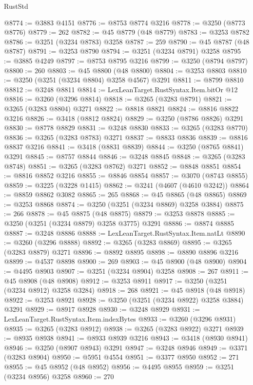\begin{lexlean}{RustStd}
\begin{coremodule}
@8774 := @3883 @4151
@8776 := @8753 @8774 @3216
@8778 := @3250 (@8773 @8776)
@8779 := 262
@8782 := @45 @8779 (@48 @8779)
@8783 := @3253 @8782
@8786 := @3251 (@3234 @8783) @3258
@8787 := 259
@8790 := @45 @8787 (@48 @8787)
@8791 := @3253 @8790
@8794 := @3251 (@3234 @8791) @3258
@8795 := @3885 @4249
@8797 := @8753 @8795 @3216
@8799 := @3250 (@8794 @8797)
@8800 := 260
@8803 := @45 @8800 (@48 @8800)
@8804 := @3253 @8803
@8810 := @3250 (@3251 (@3234 @8804) @3258 @4567) @3291
@8811 := @8799 @8810
@8812 := @3248 @8811
@8814 := LexLeanTarget.RustSyntax.Item.bitOr @12
@8816 := @3260 (@3296 @8814)
@8818 := @3265 (@3283 @8791)
@8821 := @3265 (@3283 @8804) @3271
@8822 := @8818 @8821
@8824 := @8816 @8822 @3216
@8826 := @3418 (@8812 @8824)
@8829 := @3250 (@8786 @8826) @3291
@8830 := @8778 @8829
@8831 := @3248 @8830
@8833 := @3265 (@3283 @8770)
@8836 := @3265 (@3283 @8783) @3271
@8837 := @8833 @8836
@8839 := @8816 @8837 @3216
@8841 := @3418 (@8831 @8839)
@8844 := @3250 (@8765 @8841) @3291
@8845 := @8757 @8844
@8846 := @3248 @8845
@8848 := @3265 (@3283 @8748)
@8851 := @3265 (@3283 @8762) @3271
@8852 := @8848 @8851
@8854 := @8816 @8852 @3216
@8855 := @8846 @8854
@8857 := @3070 (@8743 @8855)
@8859 := @3225 (@3228 @1415)
@8862 := @3241 (@4607 (@4610 @3242))
@8864 := @8859 @8862 @3082
@8865 := 265
@8868 := @45 @8865 (@48 @8865)
@8869 := @3253 @8868
@8874 := @3250 (@3251 (@3234 @8869) @3258 @3884)
@8875 := 266
@8878 := @45 @8875 (@48 @8875)
@8879 := @3253 @8878
@8885 := @3250 (@3251 (@3234 @8879) @3258 @3775) @3291
@8886 := @8874 @8885
@8887 := @3248 @8886
@8888 := LexLeanTarget.RustSyntax.Item.natLt
@8890 := @3260 (@3296 @8888)
@8892 := @3265 (@3283 @8869)
@8895 := @3265 (@3283 @8879) @3271
@8896 := @8892 @8895
@8898 := @8890 @8896 @3216
@8899 := @4537 @8898
@8900 := 269
@8903 := @45 @8900 (@48 @8900)
@8904 := @4495 @8903
@8907 := @3251 (@3234 @8904) @3258
@8908 := 267
@8911 := @45 @8908 (@48 @8908)
@8912 := @3253 @8911
@8917 := @3250 (@3251 (@3234 @8912) @3258 @3284)
@8918 := 268
@8921 := @45 @8918 (@48 @8918)
@8922 := @3253 @8921
@8928 := @3250 (@3251 (@3234 @8922) @3258 @3884) @3291
@8929 := @8917 @8928
@8930 := @3248 @8929
@8931 := LexLeanTarget.RustSyntax.Item.indexBytes
@8933 := @3260 (@3296 @8931)
@8935 := @3265 (@3283 @8912)
@8938 := @3265 (@3283 @8922) @3271
@8939 := @8935 @8938
@8941 := @8933 @8939 @3216
@8943 := @3418 (@8930 @8941)
@8946 := @3250 (@8907 @8943) @3291
@8947 := @3248 @8946
@8949 := @3371 (@3283 @8904)
@8950 := @5951 @4554
@8951 := @3377 @8950
@8952 := 271
@8955 := @45 @8952 (@48 @8952)
@8956 := @4495 @8955
@8959 := @3251 (@3234 @8956) @3258
@8960 := 270

\end{coremodule}
\end{lexlean}
